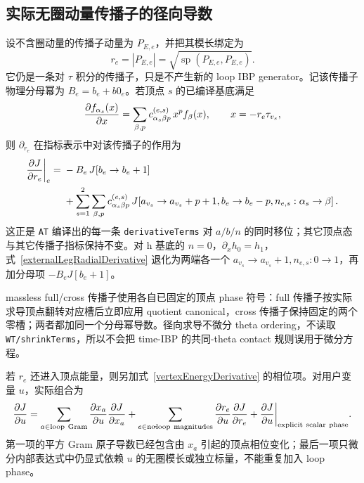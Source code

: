 ﻿\documentclass[a4paper,11pt]{article}
\begin{document}
\subsection{实际无圈动量传播子的径向导数}

设不含圈动量的传播子动量为 $P_{E,e}$，并把其模长绑定为
\begin{equation}
  r_e=|P_{E,e}|=\sqrt{\operatorname{sp}(P_{E,e},P_{E,e})}.
\end{equation}
它仍是一条对 $\tau$ 积分的传播子，只是不产生新的 loop IBP generator。记该传播子物理分母幂为 $B_e=b_e+b0_e$。若顶点 $s$ 的已编译基底满足
\begin{equation}
  {\partial f_{\alpha_s}(x)\over\partial x}
  =\sum_{\beta,p}c^{(e,s)}_{\alpha_s\beta p}\,x^p f_\beta(x),
  \qquad x=-r_e\tau_{v_s},
\end{equation}
则 $\partial_{r_e}$ 在指标表示中对该传播子的作用为
\begin{align}
 {\partial J\over\partial r_e}\bigg|_{e}
 ={}&-B_e\,J[b_e\to b_e+1]\nonumber\\
 &+\sum_{s=1}^{2}\sum_{\beta,p}
 c^{(e,s)}_{\alpha_s\beta p}\,
 J\!\left[
 a_{v_s}\to a_{v_s}+p+1,
 b_e\to b_e-p,
 n_{e,s}:\alpha_s\to\beta
 \right].
 \label{externalLegRadialDerivative}
\end{align}
这正是 \texttt{AT} 编译出的每一条 \texttt{derivativeTerms} 对 $a/b/n$ 的同时移位；其它顶点态与其它传播子指标保持不变。对 h 基底的 $n=0$，$\partial_xh_0=h_1$，式~\eqref{externalLegRadialDerivative} 退化为两端各一个 $a_{v_s}\to a_{v_s}+1,n_{e,s}:0\to1$，再加分母项 $-B_eJ[b_e+1]$。

massless full/cross 传播子使用各自已固定的顶点 phase 符号：full 传播子按实际求导顶点翻转对应槽后立即应用 quotient canonical，cross 传播子保持固定的两个零槽；两者都加同一个分母幂导数。径向求导不微分 theta ordering，不读取 \texttt{WT/shrinkTerms}，所以不会把 time-IBP 的共同-theta contact 规则误用于微分方程。

若 $r_e$ 还进入顶点能量，则另加式~\eqref{vertexEnergyDerivative} 的相位项。对用户变量 $u$，实际组合为
\begin{equation}
 {\partial J\over\partial u}
 =\sum_{a\in\mathrm{loop\ Gram}}
 {\partial x_a\over\partial u}{\partial J\over\partial x_a}
 +\sum_{e\in\mathrm{no\!\mbox{-}\!loop\ magnitudes}}
 {\partial r_e\over\partial u}{\partial J\over\partial r_e}
 +{\partial J\over\partial u}\bigg|_{\mathrm{explicit\ scalar\ phase}}.
 \label{generalKinematicCoordinateChainRule}
\end{equation}
第一项的平方 Gram 原子导数已经包含由 $x_a$ 引起的顶点相位变化；最后一项只微分内部表达式中仍显式依赖 $u$ 的无圈模长或独立标量，不能重复加入 loop phase。
\end{document}
